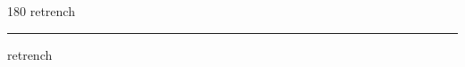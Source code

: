 
\begin{frame}
\begin{center}
\begin{turn}{180}
{\fontsize{2.5cm}{1em}\selectfont retrench}
\end{turn}
\vspace{1em}\par  
\hrule
\vspace{1em}\par  
{\fontsize{2.5cm}{1em}\selectfont retrench}
\end{center}
\end{frame}
